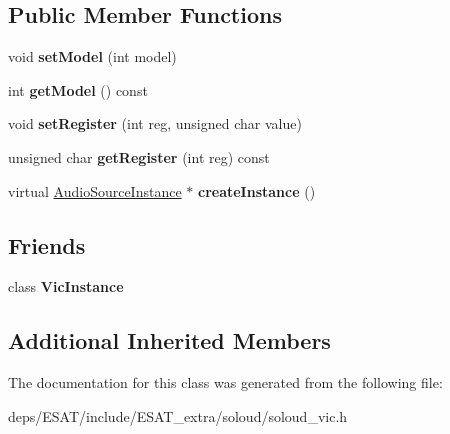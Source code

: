 \subsection*{Public Member Functions}
\begin{DoxyCompactItemize}
\item 
\mbox{\label{class_so_loud_1_1_vic_a0f50281a9b115fd11b81ee3eb700db79}} 
void {\bfseries set\+Model} (int model)
\item 
\mbox{\label{class_so_loud_1_1_vic_ad2c81766e3858af1800de741002ae928}} 
int {\bfseries get\+Model} () const
\item 
\mbox{\label{class_so_loud_1_1_vic_a7ffc185753800ed704512197ad5154e2}} 
void {\bfseries set\+Register} (int reg, unsigned char value)
\item 
\mbox{\label{class_so_loud_1_1_vic_a2039f99f01baa1f86065dd1ca44907ec}} 
unsigned char {\bfseries get\+Register} (int reg) const
\item 
\mbox{\label{class_so_loud_1_1_vic_a057fe9cd48fa0e6e773c153466e94808}} 
virtual \mbox{\hyperlink{class_so_loud_1_1_audio_source_instance}{Audio\+Source\+Instance}} $\ast$ {\bfseries create\+Instance} ()
\end{DoxyCompactItemize}
\subsection*{Friends}
\begin{DoxyCompactItemize}
\item 
\mbox{\label{class_so_loud_1_1_vic_a75ba664eca072a2a9a89d338aa6f1789}} 
class {\bfseries Vic\+Instance}
\end{DoxyCompactItemize}
\subsection*{Additional Inherited Members}


The documentation for this class was generated from the following file\+:\begin{DoxyCompactItemize}
\item 
deps/\+E\+S\+A\+T/include/\+E\+S\+A\+T\+\_\+extra/soloud/soloud\+\_\+vic.\+h\end{DoxyCompactItemize}
